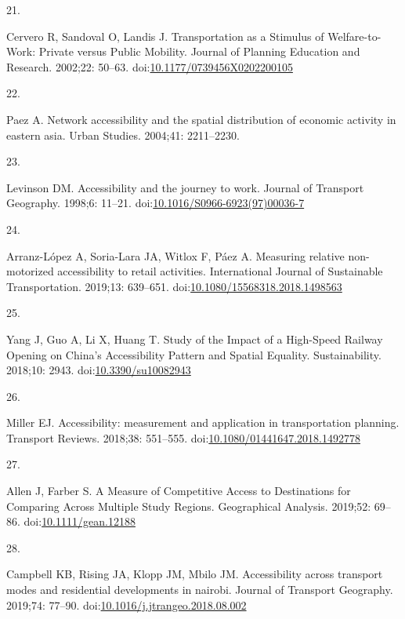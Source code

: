 \documentclass[10pt,letterpaper]{article}
\newlength{\cslhangindent}
\newlength{\csllabelwidth}
\newlength{\cslentryspacingunit} %
\newenvironment{CSLReferences}[2] %
 {%
  \setlength{\parindent}{0pt}
  \ifodd #1
  \let\oldpar\par
  \def\par{\hangindent=\cslhangindent\oldpar}
  \fi
  \setlength{\parskip}{#2\cslentryspacingunit}
 }%
 {}
\newcommand{\CSLLeftMargin}[1]{\parbox[t]{\csllabelwidth}{#1}}
\newcommand{\CSLRightInline}[1]{\parbox[t]{\linewidth - \csllabelwidth}{#1}\break}
\begin{document}
\begin{CSLReferences}{0}{0}
\leavevmode{}%
\CSLLeftMargin{21. }%
\CSLRightInline{Cervero R, Sandoval O, Landis J. Transportation as a
{Stimulus} of {Welfare}-to-{Work}: {Private} versus {Public} {Mobility}.
Journal of Planning Education and Research. 2002;22: 50--63.
doi:\href{https://doi.org/10.1177/0739456X0202200105}{10.1177/0739456X0202200105}}

\leavevmode{}%
\CSLLeftMargin{22. }%
\CSLRightInline{Paez A. Network accessibility and the spatial
distribution of economic activity in eastern asia. Urban Studies.
2004;41: 2211--2230. }

\leavevmode{}%
\CSLLeftMargin{23. }%
\CSLRightInline{Levinson DM. Accessibility and the journey to work.
Journal of Transport Geography. 1998;6: 11--21.
doi:\href{https://doi.org/10.1016/S0966-6923(97)00036-7}{10.1016/S0966-6923(97)00036-7}}

\leavevmode{}%
\CSLLeftMargin{24. }%
\CSLRightInline{Arranz-López A, Soria-Lara JA, Witlox F, Páez A.
Measuring relative non-motorized accessibility to retail activities.
International Journal of Sustainable Transportation. 2019;13: 639--651.
doi:\href{https://doi.org/10.1080/15568318.2018.1498563}{10.1080/15568318.2018.1498563}}

\leavevmode{}%
\CSLLeftMargin{25. }%
\CSLRightInline{Yang J, Guo A, Li X, Huang T. Study of the {Impact} of a
{High-Speed Railway Opening} on {China}'s {Accessibility Pattern} and
{Spatial Equality}. Sustainability. 2018;10: 2943.
doi:\href{https://doi.org/10.3390/su10082943}{10.3390/su10082943}}

\leavevmode{}%
\CSLLeftMargin{26. }%
\CSLRightInline{Miller EJ. Accessibility: measurement and application in
transportation planning. Transport Reviews. 2018;38: 551--555.
doi:\href{https://doi.org/10.1080/01441647.2018.1492778}{10.1080/01441647.2018.1492778}}

\leavevmode{}%
\CSLLeftMargin{27. }%
\CSLRightInline{Allen J, Farber S. A Measure of Competitive Access to
Destinations for Comparing Across Multiple Study Regions. Geographical
Analysis. 2019;52: 69--86.
doi:\href{https://doi.org/10.1111/gean.12188}{10.1111/gean.12188}}

\leavevmode{}%
\CSLLeftMargin{28. }%
\CSLRightInline{Campbell KB, Rising JA, Klopp JM, Mbilo JM.
Accessibility across transport modes and residential developments in
nairobi. Journal of Transport Geography. 2019;74: 77--90.
doi:\href{https://doi.org/10.1016/j.jtrangeo.2018.08.002}{10.1016/j.jtrangeo.2018.08.002}}


\end{CSLReferences}
\end{document}

